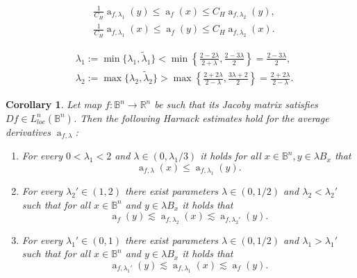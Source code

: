 \documentclass[10pt,a4paper]{amsart}
\newtheorem{cor}{Corollary}
\newcommand{\B}{\mathbb{B}^n}
\newcommand{\R}{\mathbb{R}}
\renewcommand{\a}{\operatorname{a}}
\begin{document}
	\begin{align}
		& \frac{1}{C_H} \a_{f,\lambda_1}(y)\leq \a_f(x)\leq C_H\a_{f,\lambda_2}(y), \\
		& \frac{1}{C_H} \a_{f,\lambda_1}(x)\leq \a_f(y)\leq C_H\a_{f,\lambda_2}(x). 
	\end{align}

\begin{align}
 &\lambda_1:=\min \{ \lambda_1,\tilde{\lambda}_1\}<\min\left\{\frac{2-2\lambda}{2+\lambda}, \frac{2-3\lambda }{2}\right\}=\frac{2-3\lambda }{2}, \label{eq-lambda1}\\
 &\lambda_2:=\max\{ \lambda_2,\tilde{\lambda}_2\}>\max\left \{\frac{2+2\lambda}{2-\lambda}, \frac{3\lambda +2}{2}\right\}=\frac{2+2\lambda}{2-\lambda}. \label{eq-lambda2}
\end{align}

\begin{cor}\label{cor:harnack-est}
Let map $f:\B\rightarrow \R^n$ be such that its Jacoby matrix satisfies ${D\!f \in L^n_{loc}(\B)}$.
Then the following Harnack estimates hold for the average derivatives $\a_{f,\lambda}$:
\begin{enumerate}
\item[(a)] For every $0<\lambda_1<2$ and $\lambda \in (0,  \lambda_1/3 )$ it holds for all $x\in \B , y\in\lambda B_x$  that
\begin{equation}
\a_{f,\lambda}(x)\leq \a_{f,\lambda_1}(y). 
\label{eq:Harnacklambda1prime}
\end{equation}
\item[(b)] For every $\lambda_2' \in (1,2)$ there exist parameters $\lambda\in (0,1/2)$ and $\lambda_2 <\lambda_2'$ such that for all $x\in \B$ and $y\in \lambda B_x$ it holds that
\begin{equation}
\a_f(y)\lesssim \a_{f,\lambda_2}(x) \lesssim \a_{f,\lambda_2'}(y). \label{cor12:est2}
\end{equation}
\item[(c)] For every $\lambda_1'\in (0,1)$ there exist parameters $\lambda\in (0,1/2)$ and $\lambda_1>\lambda_1'$ such that for all $x\in \B$ and $y\in \lambda B_x$ it holds that
\begin{equation}
 \a_{f,\lambda_1'}(y)\lesssim \a_{f,\lambda_1}(x) \lesssim \a_{f}(y). \label{cor12:est3}
\end{equation}
\end{enumerate}
\end{cor}
\end{document}
